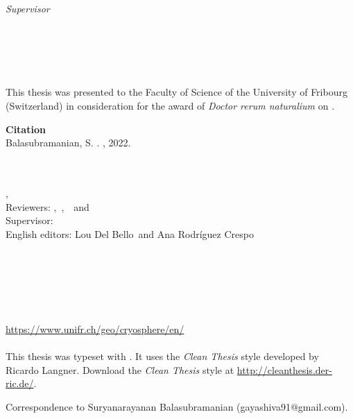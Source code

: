 \begin{titlepage}
	\begin{minipage}[t]{.27\textwidth}
		\raggedleft
		\textit{Supervisor}
	\end{minipage}
	\hspace*{15pt}
	\begin{minipage}[t]{.65\textwidth}
		{\Large \thesisFirstSupervisor} \\
	\end{minipage} \\[10mm]

	\thesisDate \\

\end{titlepage}



This thesis was presented to the Faculty of Science of the University of Fribourg (Switzerland) in consideration
for the award of \textit{Doctor rerum naturalium} on \thesisDate.

\vfill
{\large \textbf{Citation} \\}
Balasubramanian, S. \thesisTitle . \thesisUniversityGroup, 2022.

\hfill
\vfill
{
	\small
	\textbf{\thesisName} \\
	\textit{\thesisTitle} \\
	\thesisSubject, \thesisDate \\
	Reviewers: \thesisFirstReviewer,\ \thesisSecondReviewer,\ \thesisThirdReviewer\ and \thesisFourthReviewer \\
	Supervisor: \thesisFirstSupervisor \\
	English editors: Lou Del Bello\ and Ana Rodríguez Crespo\\[1.5em]
	\textbf{\thesisUniversity} \\
	\textit{\thesisUniversityGroup} \\
	\thesisUniversityDepartment \\
	\thesisUniversityStreetAddress \\
	\thesisUniversityCity \\
	\thesisUniversityPostalCode \\
  \url{https://www.unifr.ch/geo/cryosphere/en/}\\
\\
  This thesis was typeset with \LaTeXe.
  It uses the \textit{Clean Thesis} style developed by Ricardo Langner.
  Download the \textit{Clean Thesis} style at \url{http://cleanthesis.der-ric.de/}.

  Correspondence to Suryanarayanan Balasubramanian (gayashiva91@gmail.com).
}

